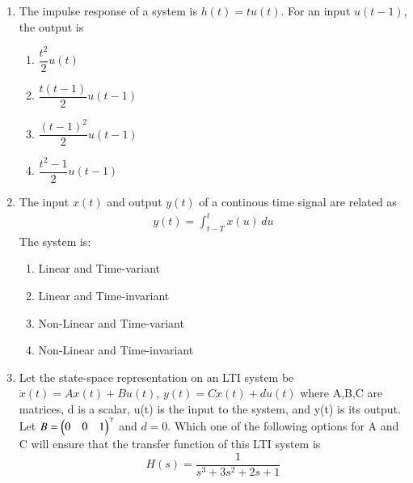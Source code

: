 \renewcommand{\theequation}{\theenumi}
\begin{enumerate}[label=\arabic*.,ref=\theenumi]

\item The impulse response of a system is $h(t)=tu(t)$. For an input $u(t-1)$, the output is 
\begin{enumerate}
    \item $\dfrac{t^{2}}{2}u(t)$
    \item $\dfrac{t(t-1)}{2}u(t-1)$
    \item $\dfrac{(t-1)^{2}}{2}u(t-1)$
    \item $\dfrac{t^{2}-1}{2}u(t-1)$
\end{enumerate}
\solution

%
\item The input $x(t)$ and output $y(t)$ of a continous time signal are related as
\begin{align}
    y(t) = \int_{t-T}^tx(u)\,du
\end{align}
The system is:
\begin{enumerate}
    \item Linear and Time-variant
    \item Linear and Time-invariant
    \item Non-Linear and Time-variant
    \item Non-Linear and Time-invariant
\end{enumerate}
\solution



\item Let the state-space representation on an LTI system be $\dot{x}(t) = Ax(t)+Bu(t)$, $y(t)=Cx(t)+du(t)$ where A,B,C are matrices,  d is a scalar, u(t) is the input to the system, and y(t) is its output. Let $B = \begin{pmatrix} 0 & 0 &  1\end{pmatrix}^\top$ and $d = 0$. Which one of the following options for A and C will ensure that the transfer function of this LTI system is 
\begin{equation}
    H(s) = \dfrac{1}{s^3+3s^2+2s+1}
\end{equation}


\end{enumerate}
